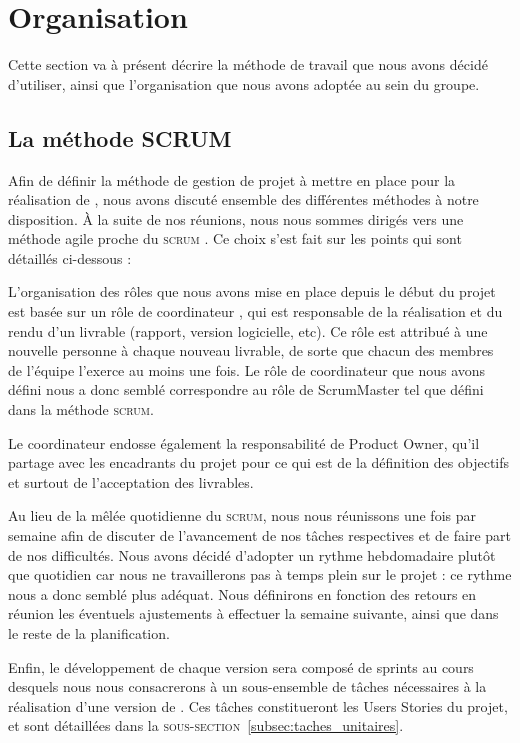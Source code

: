 \section{Organisation}
    \label{sec:orga}
    Cette section va à présent décrire la méthode de travail que nous avons décidé d'utiliser, ainsi que l'organisation que nous avons adoptée au sein du groupe.

    \subsection{La méthode SCRUM}
    \label{subsec:scrum}
        Afin de définir la méthode de gestion de projet à mettre en place pour la réalisation de \glasir{}, nous avons discuté ensemble des différentes méthodes à notre disposition. À la suite de nos réunions, nous nous sommes dirigés vers une méthode agile proche du \og \textsc{scrum} \fg{}. Ce choix s'est fait sur les points qui sont détaillés ci-dessous :

        L'organisation des rôles que nous avons mise en place depuis le début du projet est basée sur un rôle de \og coordinateur \fg{}, qui est responsable de la réalisation et du rendu d'un livrable (rapport, version logicielle, etc). Ce rôle est attribué à une nouvelle personne à chaque nouveau livrable, de sorte que chacun des membres de l'équipe l'exerce au moins une fois. Le rôle de coordinateur que nous avons défini nous a donc semblé correspondre au rôle de ScrumMaster tel que défini dans la méthode \textsc{scrum}.

        Le coordinateur endosse également la responsabilité de Product Owner, qu'il partage avec les encadrants du projet pour ce qui est de la définition des objectifs et surtout de l'acceptation des livrables.

        Au lieu de la mêlée quotidienne du \textsc{scrum}, nous nous réunissons une fois par semaine afin de discuter de l'avancement de nos tâches respectives et de faire part de nos difficultés. Nous avons décidé d'adopter un rythme hebdomadaire plutôt que quotidien car nous ne travaillerons pas à temps plein sur le projet : ce rythme nous a donc semblé plus adéquat. Nous définirons en fonction des retours en réunion les éventuels ajustements à effectuer la semaine suivante, ainsi que dans le reste de la planification.

        Enfin, le développement de chaque version sera composé de sprints au cours desquels nous nous consacrerons à un sous-ensemble de tâches nécessaires à la réalisation d'une version de \glasir{}. Ces tâches constitueront les Users Stories du projet, et sont détaillées dans la \textsc{sous-section}~\ref{subsec:taches_unitaires}.  
    
